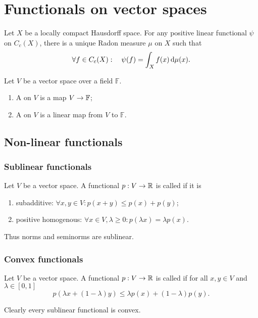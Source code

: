 \chapter{Functionals on vector spaces}

\begin{theorem}
Let $X$ be a locally compact Hausdorff space. For any positive linear functional $\psi$ on $C_c(X)$, there is a unique Radon measure $\mu$ on $X$ such that
\[ \forall f\in C_c(X): \quad \psi(f) = \int_X f(x)\operatorname{d \!}{\mu(x)}. \]
\end{theorem}

\begin{definition}
Let $V$ be a vector space over a field $\mathbb{F}$.
\begin{enumerate}
\item A  on $V$ is a map $V\to \mathbb{F}$;
\item A  on $V$ is a linear map from $V$ to $\mathbb{F}$.
\end{enumerate}
\end{definition}

\section{Non-linear functionals}
\subsection{Sublinear functionals}
\begin{definition}
Let $V$ be a vector space. A functional $p:V\to \mathbb{R}$ is called  if it is
\begin{enumerate}
\item subadditive: $\forall x,y\in V: p(x+y) \leq p(x) + p(y)$;
\item positive homogenous: $\forall x\in V,\lambda\geq 0: p(\lambda x) = \lambda p(x)$.
\end{enumerate}
\end{definition}
Thus norms and seminorms are sublinear.

\subsection{Convex functionals}
\begin{definition}
Let $V$ be a vector space. A functional $p:V\to \mathbb{R}$ is called  if for all $x,y\in V$ and $\lambda\in [0,1]$
\[ p(\lambda x + (1-\lambda)y) \leq \lambda p(x) + (1-\lambda)p(y). \]
\end{definition}
Clearly every sublinear functional is convex.

